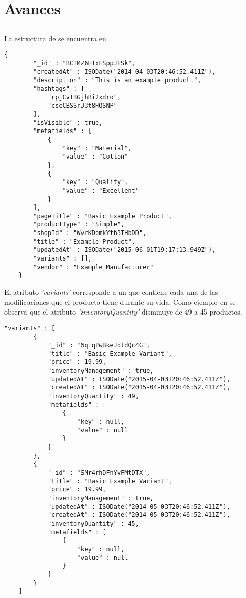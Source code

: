 \chapter{ Avances \dataModelAS }\label{ap:avance_data_model}

\section{\itemcollection}

La estructura de \itemcollection se encuentra en .

\medskip
\begin{lstlisting}[caption= \dataModelAS de \itemcollection, label=source:javascript:data_model_item]
	{
	    "_id" : "BCTMZ6HTxFSppJESk",
	    "createdAt" : ISODate("2014-04-03T20:46:52.411Z"),
	    "description" : "This is an example product.",
	    "hashtags" : [ 
	        "rpjCvTBGjhBi2xdro", 
	        "cseCBSSrJ3t8HQSNP"
	    ],
	    "isVisible" : true,
	    "metafields" : [ 
	        {
	            "key" : "Material",
	            "value" : "Cotton"
	        }, 
	        {
	            "key" : "Quality",
	            "value" : "Excellent"
	        }
	    ],
	    "pageTitle" : "Basic Example Product",
	    "productType" : "Simple",
	    "shopId" : "WvrKDomkYth3THbDD",
	    "title" : "Example Product",
	    "updatedAt" : ISODate("2015-06-01T19:17:13.949Z"),
	    "variants" : [],
	    "vendor" : "Example Manufacturer"
	}
\end{lstlisting}

El atributo \textit{'variants'} corresponde a un \arrayPL que contiene cada una de las modificaciones que el producto tiene durante su vida. Como ejemplo en  se observa que el atributo \textit{'inventoryQuantity'} disminuye de 49 a 45 productos.

\medskip
\begin{lstlisting}[caption= El \arrayPL "variants", label=source:javascript:data_model_item_variant]
	 "variants" : [ 
        {
            "_id" : "6qiqPwBkeJdtdQc4G",
            "title" : "Basic Example Variant",
            "price" : 19.99,
            "inventoryManagement" : true,
            "updatedAt" : ISODate("2015-04-03T20:46:52.411Z"),
            "createdAt" : ISODate("2015-04-03T20:46:52.411Z"),
            "inventoryQuantity" : 49,
            "metafields" : [ 
                {
                    "key" : null,
                    "value" : null
                }
            ]
        }, 
        {
            "_id" : "SMr4rhDFnYvFMtDTX",
            "title" : "Basic Example Variant",
            "price" : 19.99,
            "inventoryManagement" : true,
            "updatedAt" : ISODate("2014-05-03T20:46:52.411Z"),
            "createdAt" : ISODate("2014-05-03T20:46:52.411Z"),
            "inventoryQuantity" : 45,
            "metafields" : [ 
                {
                    "key" : null,
                    "value" : null
                }
            ]
        }
    ]
\end{lstlisting}



